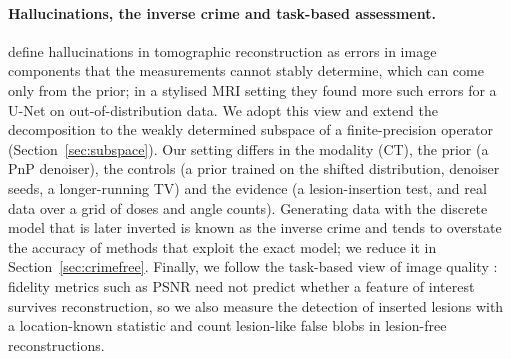 \paragraph{Hallucinations, the inverse crime and task-based assessment.}
\citet{bhadra2021} define hallucinations in tomographic reconstruction as errors in image components that the
measurements cannot stably determine, which can come only from the prior; in a stylised MRI setting they
found more such errors for a U-Net on out-of-distribution data. We adopt this view and extend the decomposition
to the weakly determined subspace of a finite-precision operator (Section~\ref{sec:subspace}). Our setting
differs in the modality (CT), the prior (a PnP denoiser), the controls (a prior trained on the shifted
distribution, denoiser seeds, a longer-running TV) and the evidence (a lesion-insertion test, and real data over
a grid of doses and angle counts). Generating data with the discrete model that is later inverted is known as
the inverse crime \citep{wirgin2004,kaipio2005} and tends to overstate the accuracy of methods that exploit the
exact model; we reduce it in Section~\ref{sec:crimefree}. Finally, we follow the task-based view of image
quality \citep{barrett1993,barrett2004}: fidelity metrics such as PSNR need not predict whether a feature of
interest survives reconstruction, so we also measure the detection of inserted lesions with a location-known
statistic and count lesion-like false blobs in lesion-free reconstructions.